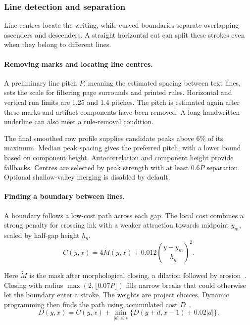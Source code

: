 \subsubsection{Line detection and separation}
Line centres locate the writing, while curved boundaries separate overlapping ascenders and descenders. A straight horizontal cut can split these strokes even when they belong to different lines.

\paragraph{Removing marks and locating line centres.}
A preliminary line pitch $P$, meaning the estimated spacing between text lines, sets the scale for filtering page surrounds and printed rules. Horizontal and vertical run limits are 1.25 and 1.4 pitches. The pitch is estimated again after these marks and artifact components have been removed. A long handwritten underline can also meet a rule-removal condition.

The final smoothed row profile supplies candidate peaks above 6\% of its maximum. Median peak spacing gives the preferred pitch, with a lower bound based on component height. Autocorrelation and component height provide fallbacks. Centres are selected by peak strength with at least $0.6P$ separation. Optional shallow-valley merging is disabled by default.

\paragraph{Finding a boundary between lines.}
A boundary follows a low-cost path across each gap. The local cost combines a strong penalty for crossing ink with a weaker attraction towards midpoint $y_m$, scaled by half-gap height $h_g$.
\begin{equation}
C(y,x)=4\widetilde M(y,x)
+0.012\left(\frac{y-y_m}{h_g}\right)^2.
\label{eq:des-seamcost}
\end{equation}

Here $\widetilde M$ is the mask after morphological closing, a dilation followed by erosion~\cite[p.~541]{haralick1987}. Closing with radius $\max(2,\lfloor0.07P\rfloor)$ fills narrow breaks that could otherwise let the boundary enter a stroke. The weights are project choices. Dynamic programming then finds the path using accumulated cost $D$~\cite[p.~3]{avidan2007}.
\begin{equation}
D(y,x)=C(y,x)+\min_{|d|\leq s}
\{D(y+d,x-1)+0.02|d|\}.
\label{eq:des-seam}
\end{equation}

